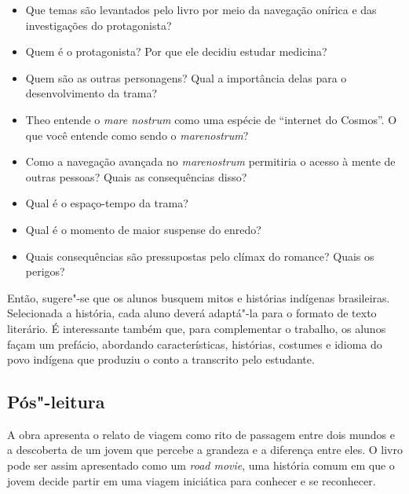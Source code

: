 \documentclass[12pt]{extarticle}
\begin{document}
\begin{itemize} 
\item Que temas são levantados pelo livro por meio da navegação
    onírica e das investigações do protagonista?

\item Quem é o protagonista? Por que ele decidiu estudar medicina?

\item Quem são as outras personagens? Qual a importância delas para o desenvolvimento da trama?

\item Theo entende o \emph{mare nostrum} como uma espécie de “internet do Cosmos”. O que você entende como sendo o \emph{marenostrum}? 

\item Como a navegação avançada no \emph{marenostrum} permitiria o acesso à mente de outras pessoas? Quais as consequências disso?

\item Qual é o espaço-tempo da trama?

\item Qual é o momento de maior suspense do enredo?

\item Quais consequências são pressupostas pelo clímax do romance? Quais os perigos?

 \end{itemize}

Então, sugere"-se que os alunos busquem mitos e histórias indígenas brasileiras. Selecionada a história, cada aluno deverá adaptá"-la para o formato de texto literário. É interessante também que, para complementar o trabalho, os alunos façam um prefácio, abordando características, histórias, costumes e idioma do povo indígena que produziu o conto a transcrito pelo
estudante.



\subsection{Pós"-leitura}

   

A obra apresenta o relato de viagem como rito de passagem entre dois mundos e a descoberta de um jovem que percebe a grandeza e a diferença entre eles. O livro pode ser assim apresentado como um \textit{road movie}, uma história comum em que o jovem decide partir em uma viagem iniciática para conhecer e se reconhecer.
\end{document}
